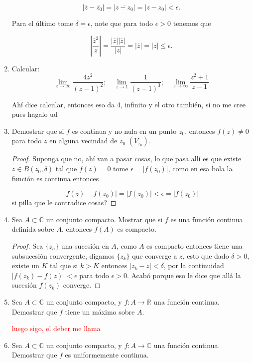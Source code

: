 \documentclass[11pt]{article}
\begin{document}
\begin{enumerate}
$$|\overline{z}-\overline{z_0}|=|\overline{z-z_0}|=|z-z_0|<\epsilon.$$

Para el último tome $\delta=\epsilon$, note que para todo $\epsilon>0$ tenemos que

$$\left|\frac{\overline{z}^2}{z} \right|=\frac{|\overline{z}||\overline{z}|}{|z|}=|\overline{z}|=|z|\leq\epsilon.$$

    \item Calcular:
    \[
    \lim_{z \to \infty} \frac{4z^2}{(z - 1)^2}; \quad \lim_{z \to 1} \frac{1}{(z - 1)^3}; \quad \lim_{z \to \infty} \frac{z^2 + 1}{z - 1}
    \]

    Ahí dice calcular, entonces eso da 4, infinito y el otro también, si no me cree pues hagalo ud

    \item Demostrar que si $f$ es continua y no nula en un punto $z_0$, entonces $f(z) \neq 0$ para todo $z$ en alguna vecindad de $z_0$ $(V_{z_0})$.

\begin{proof}
Suponga que no, ahí van a pasar cosas, lo que pasa allí es que existe $z\in B(z_0,\delta)$ tal que $f(z)=0$ tome $\epsilon=|f(z_0)|$, como en esa bola la función es continua entonces

$$|f(z)-f(z_0)|=|f(z_0)|<\epsilon=|f(z_0)|$$
si pilla que le contradice cosas?
\end{proof}

    \item Sea $A \subset \mathbb{C}$ un conjunto compacto. Mostrar que si $f$ es una función continua definida sobre $A$, entonces $f(A)$ es compacto.

\begin{proof}
Sea $\{z_n\}$ una sucesión en $A$, como $A$ es compacto entonces tiene una subsucesión convergente, digamos $\{z_{k}\}$ que converge a $z$, esto que dado $\delta>0$, existe un $K$ tal que si $k>K$ entonces $|z_{k}-z|<\delta$, por la continuidad $|f(z_k)-f(z)|<\epsilon$ para todo $\epsilon>0$. Acabó porque eso le dice que allá la sucesión $f(z_k)$ converge.
\end{proof}

    \item Sea $A \subset \mathbb{C}$ un conjunto compacto, y $f: A \to \mathbb{R}$ una función continua. Demostrar que $f$ tiene un máximo sobre $A$.

    \textcolor{red}{luego sigo, el deber me llama}

    \item Sea $A \subset \mathbb{C}$ un conjunto compacto, y $f: A \to \mathbb{C}$ una función continua. Demostrar que $f$ es uniformemente continua.
\end{enumerate}
\end{document}
